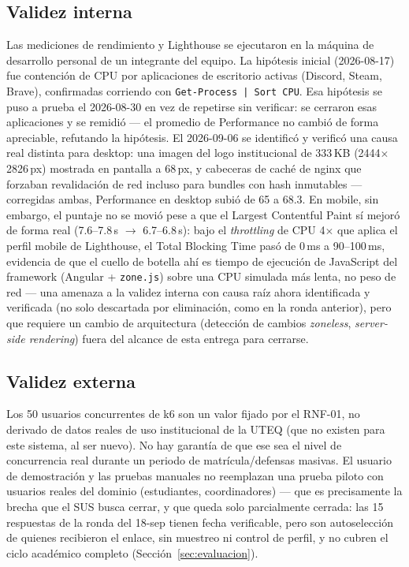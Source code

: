 \subsection{Validez interna}
Las mediciones de rendimiento y Lighthouse se ejecutaron en la máquina de desarrollo personal de un
integrante del equipo. La hipótesis inicial (2026-08-17) fue contención de CPU por aplicaciones de
escritorio activas (Discord, Steam, Brave), confirmadas corriendo con \texttt{Get-Process | Sort CPU}.
Esa hipótesis se puso a prueba el 2026-08-30 en vez de repetirse sin verificar: se cerraron esas
aplicaciones y se remidió --- el promedio de Performance no cambió de forma apreciable, refutando la
hipótesis. El 2026-09-06 se identificó y verificó una causa real distinta para desktop: una imagen del
logo institucional de 333\,KB (2444$\times$2826\,px) mostrada en pantalla a 68\,px, y cabeceras de caché
de nginx que forzaban revalidación de red incluso para bundles con hash inmutables --- corregidas ambas,
Performance en desktop subió de 65 a 68.3. En mobile, sin embargo, el puntaje no se movió pese a que el
Largest Contentful Paint sí mejoró de forma real (7.6--7.8\,s $\to$ 6.7--6.8\,s): bajo el
\emph{throttling} de CPU 4$\times$ que aplica el perfil mobile de Lighthouse, el Total Blocking Time pasó
de 0\,ms a 90--100\,ms, evidencia de que el cuello de botella ahí es tiempo de ejecución de JavaScript del
framework (Angular + \texttt{zone.js}) sobre una CPU simulada más lenta, no peso de red --- una amenaza a
la validez interna con causa raíz ahora identificada y verificada (no solo descartada por eliminación,
como en la ronda anterior), pero que requiere un cambio de arquitectura (detección de cambios
\emph{zoneless}, \emph{server-side rendering}) fuera del alcance de esta entrega para cerrarse.

\subsection{Validez externa}
Los 50 usuarios concurrentes de k6 son un valor fijado por el RNF-01, no derivado de datos reales de uso
institucional de la UTEQ (que no existen para este sistema, al ser nuevo). No hay garantía de que ese
sea el nivel de concurrencia real durante un periodo de matrícula/defensas masivas. El usuario de
demostración y las pruebas manuales no reemplazan una prueba piloto con usuarios reales del dominio
(estudiantes, coordinadores) --- que es precisamente la brecha que el SUS busca cerrar, y que queda solo
parcialmente cerrada: las 15 respuestas de la ronda del 18-sep tienen fecha verificable, pero son
autoselección de quienes recibieron el enlace, sin muestreo ni control de perfil, y no cubren el ciclo
académico completo (Sección~\ref{sec:evaluacion}).

